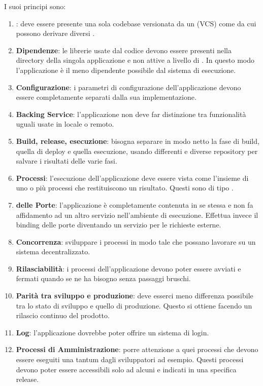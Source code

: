 		I suoi principi sono:

		\begin{enumerate}
			\item \textbf{}: deve essere presente una sola codebase versionata da un  (VCS) come  da cui
			possono derivare diversi .
			\item \textbf{Dipendenze}: le librerie usate dal codice devono essere presenti nella directory della singola applicazione e non attive a livello di . In questo modo l'applicazione è il meno dipendente possibile dal sistema di esecuzione.
			\item \textbf{Configurazione}: i parametri di configurazione dell'applicazione devono essere completamente separati dalla sua implementazione.
			\item \textbf{Backing Service}: l'applicazione non deve far distinzione tra funzionalità uguali usate in locale o remoto.
			\item \textbf{Build, release, esecuzione}: bisogna separare in modo netto la fase di build, quella di deploy e quella esecuzione, usando  differenti e diverse repository per salvare i risultati delle varie fasi.
			\item \textbf{Processi}: l'esecuzione dell'applicazione deve essere vista come l'insieme di uno o più processi che restituiscono un risultato. Questi sono di tipo .
			\item \textbf{ delle Porte}: l'applicazione è completamente contenuta in se stessa e non fa affidamento ad un altro servizio nell'ambiente di esecuzione. Effettua invece il binding delle porte diventando un servizio per le richieste esterne.
			\item \textbf{Concorrenza}: sviluppare i processi in modo tale che possano lavorare su un sistema decentralizzato.
			\item \textbf{Rilasciabilità}: i processi dell'applicazione devono poter essere avviati e fermati quando se ne ha bisogno senza passaggi bruschi.
			\item \textbf{Parità tra sviluppo e produzione}: deve esserci meno differenza possibile tra lo stato di sviluppo e quello di produzione. Questo si ottiene facendo un rilascio continuo del prodotto.
			\item \textbf{Log}: l'applicazione dovrebbe poter offrire un sistema di login.
			\item \textbf{Processi di Amministrazione}: porre attenzione a quei processi che devono essere eseguiti una tantum dagli sviluppatori ad esempio. Questi processi devono poter essere accessibili solo ad alcuni e indicati in una specifica release.
		\end{enumerate}

